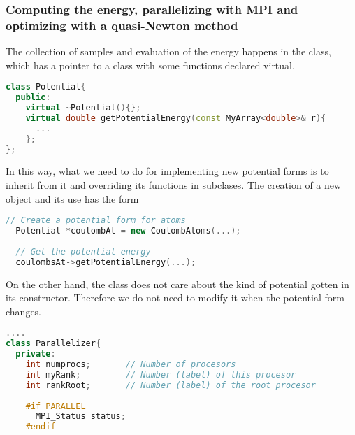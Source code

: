 \subsubsection{Computing the energy, parallelizing with MPI and optimizing with a quasi-Newton method}
The collection of samples and evaluation of the energy happens in the  class, which has a pointer to a  class with some functions declared virtual. 
\begin{lstlisting}[language=c++]
class Potential{
  public:
    virtual ~Potential(){};
    virtual double getPotentialEnergy(const MyArray<double>& r){
      ...
    };
};
\end{lstlisting}
\noindent
In this way, what we need to do for implementing new potential forms is to inherit from it and overriding its functions in subclases. The creation of a new object and its use has the form
\begin{lstlisting}[language=c++]
  // Create a potential form for atoms
  Potential *coulombAt = new CoulombAtoms(...);
  
  // Get the potential energy
  coulombsAt->getPotentialEnergy(...); 
\end{lstlisting}
On the other hand, the  class  does not care about the kind of potential gotten in its constructor. Therefore we do not need to modify it when the potential form changes.
\begin{lstlisting}[language=c++]
....
class Parallelizer{
  private:
    int numprocs;       // Number of procesors
    int myRank;         // Number (label) of this procesor
    int rankRoot;       // Number (label) of the root procesor
    
    #if PARALLEL
      MPI_Status status;
    #endif
\end{lstlisting}

